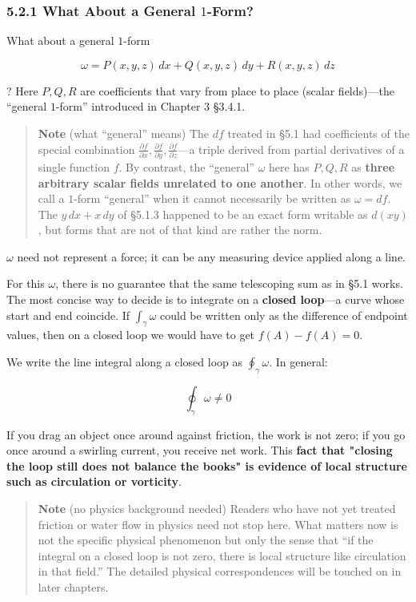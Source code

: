 \documentclass[a4paper,12pt,openany]{book}
\begin{document}
\hypertarget{what-about-a-general-1-form}{%
\subsubsection{\texorpdfstring{5.2.1 What About a General
\(1\)-Form?}{5.2.1 What About a General 1-Form?}}\label{what-about-a-general-1-form}}

What about a general \(1\)-form

\[\omega = P(x,y,z)\,dx + Q(x,y,z)\,dy + R(x,y,z)\,dz\]

? Here \(P, Q, R\) are coefficients that vary from place to place
(scalar fields)—the ``general \(1\)-form'' introduced in Chapter 3
§3.4.1.

\begin{quote}
\textbf{Note} (what ``general'' means) The \(df\) treated in §5.1 had
coefficients of the special combination
\(\frac{\partial f}{\partial x}, \frac{\partial f}{\partial y}, \frac{\partial f}{\partial z}\)—a
triple derived from partial derivatives of a single function \(f\). By
contrast, the ``general'' \(\omega\) here has \(P, Q, R\) as
\textbf{three arbitrary scalar fields unrelated to one another}. In
other words, we call a \(1\)-form ``general'' when it cannot necessarily
be written as \(\omega = df\). The \(y\,dx + x\,dy\) of §5.1.3 happened
to be an exact form writable as \(d(xy)\), but forms that are not of
that kind are rather the norm.
\end{quote}

\(\omega\) need not represent a force; it can be any measuring device
applied along a line.

For this \(\omega\), there is no guarantee that the same telescoping sum
as in §5.1 works. The most concise way to decide is to integrate on a
\textbf{closed loop}—a curve whose start and end coincide. If
\(\int_\gamma \omega\) could be written only as the difference of
endpoint values, then on a closed loop we would have to get
\(f(A)-f(A)=0\).

We write the line integral along a closed loop as
\(\oint_\gamma \omega\). In general:

\[\oint_\gamma \omega \neq 0\]

If you drag an object once around against friction, the work is not
zero; if you go once around a swirling current, you receive net work.
This
\textbf{fact that "closing the loop still does not balance the books" is evidence of local structure such as circulation or vorticity}.

\begin{quote}
\textbf{Note} (no physics background needed) Readers who have not yet
treated friction or water flow in physics need not stop here. What
matters now is not the specific physical phenomenon but only the sense
that ``if the integral on a closed loop is not zero, there is local
structure like circulation in that field.'' The detailed physical
correspondences will be touched on in later chapters.
\end{quote}
\end{document}

